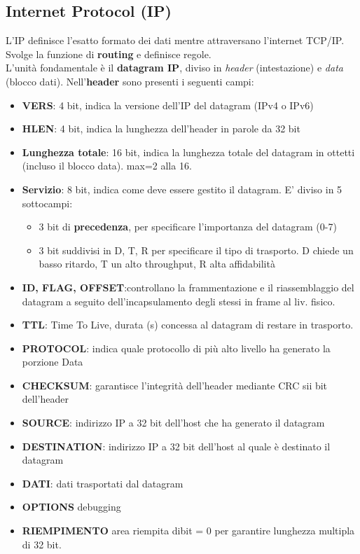 \documentclass[a4paper,11pt]{article}
\begin{document}
\subsection{Internet Protocol (IP)}
L'IP definisce l'esatto formato dei dati mentre attraversano l'internet TCP/IP. Svolge la funzione di \textbf{routing} e definisce regole.\\
 L'unità fondamentale è il \textbf{datagram IP}, diviso in \textit{header} (intestazione) e \textit{data} (blocco dati).
 Nell'\textbf{header} sono presenti i seguenti campi:
 \begin{itemize}
 \item\textbf{VERS}: 4 bit, indica la versione dell'IP del datagram (IPv4 o IPv6)
 \item\textbf{HLEN}: 4 bit, indica la lunghezza dell'header in parole da 32 bit
 \item\textbf{Lunghezza totale}: 16 bit, indica la lunghezza totale del datagram in ottetti (incluso il blocco data). max=2 alla 16.
 \item\textbf{Servizio}: 8 bit, indica come deve essere gestito il datagram. E' diviso in 5 sottocampi:
 \begin{itemize}
 \item 3 bit di \textbf{precedenza}, per specificare l'importanza del datagram (0-7)
 \item3 bit suddivisi in D, T, R per specificare il tipo di trasporto. D chiede un basso ritardo, T un alto throughput, R alta affidabilità
 \end{itemize}
 \item\textbf{ID, FLAG, OFFSET}:controllano la frammentazione e il riassemblaggio del datagram a seguito dell'incapsulamento degli stessi in frame al liv. fisico.
 \item\textbf{TTL}: Time To Live, durata (s) concessa al datagram di restare in trasporto.
 \item\textbf{PROTOCOL}: indica quale protocollo di più alto livello ha generato la porzione Data
 \item\textbf{CHECKSUM}: garantisce l'integrità dell'header mediante CRC sii bit dell'header
 \item\textbf{SOURCE}: indirizzo IP a 32 bit dell'host che ha generato il datagram
 \item\textbf{DESTINATION}: indirizzo IP a 32 bit dell'host al quale è destinato il datagram
 \item\textbf{DATI}: dati trasportati dal datagram
 \item\textbf{OPTIONS} debugging
 \item\textbf{RIEMPIMENTO} area riempita dibit = 0 per garantire lunghezza multipla di 32 bit.
 \end{itemize}
\end{document}
